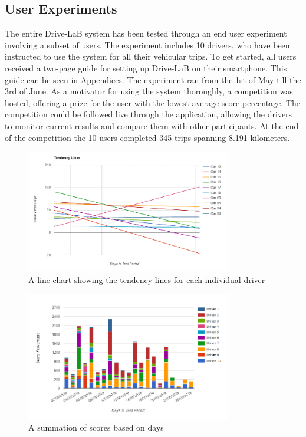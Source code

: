 \subsection{User Experiments}\label{subsec:userexp}

The entire Drive-LaB system has been tested through an end user experiment involving a subset of users. The experiment includes 10 drivers, who have been instructed to use the system for all their vehicular trips. To get started, all users received a two-page guide for setting up Drive-LaB on their smartphone. This guide can be seen in Appendices. The experiment ran from the 1st of May till the 3rd of June. As a motivator for using the system thoroughly, a competition was hosted, offering a prize for the user with the lowest average score percentage. The competition could be followed live through the application, allowing the drivers to monitor current results and compare them with other participants. At the end of the competition the 10 users completed 345 trips spanning 8.191 kilometers.

\begin{figure}[!]
\centering
\includegraphics[width=0.80\textwidth]{Pictures/tendenslinjer}
\caption{A line chart showing the tendency lines for each individual driver}
\label{fig:tendencylines}
\end{figure}

\begin{figure}[!]
\centering
\includegraphics[width=0.80\textwidth]{Pictures/summationoftripscore}
\caption{A summation of scores based on days}
\label{fig:summationoftripscore}

\end{figure}

